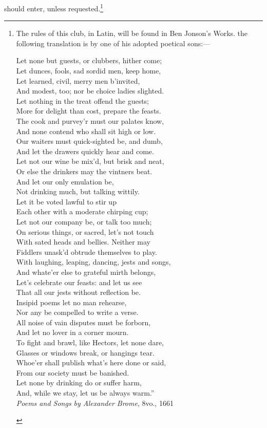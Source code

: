 should enter, unless requested.\footnote{\textit{}
The rules of this club, in Latin, will be found in Ben
Jonson’s Works. the following translation is by one of
his adopted poetical sons:—
\settowidth{\versewidth}{Let none but guests, or clubbers, hither come;}
\begin{fnverse}
Let none but guests, or clubbers, hither come;\\
Let dunces, fools, sad sordid men, keep home,\\
Let learned, civil, merry men b’invited,\\
And modest, too; nor be choice ladies slighted.\\
Let nothing in the treat offend the guests;\\
More for delight than cost, prepare the feasts.\\
The cook and purvey’r must our palates know,\\
And none contend who shall sit high or low.\\
Our waiters must quick-sighted be, and dumb,\\
And let the drawers quickly hear and come.\\
Let not our wine be mix'd, but brisk and neat,\\
Or else the drinkers may the vintners beat.\\
And let our only emulation be,\\
Not drinking much, but talking wittily.\\
Let it be voted lawful to stir up\\
Each other with a moderate chirping cup;\\
Let not our company be, or talk too much;\\
On serious things, or sacred, let's not touch\\
With sated heads and bellies. Neither may\\
Fiddlers unask’d obtrude themselves to play.\\
With laughing, leaping, dancing, jests and songs,\\
And whate’er else to grateful mirth belongs,\\
Let’s celebrate our feasts: and let us see\\
That all our jests without reflection be.\\
Insipid poems let no man rehearse,\\
Nor any be compelled to write a verse.\\
All noise of vain disputes must be forborn,\\
And let no lover in a corner mourn.\\
To fight and brawl, like Hectors, let none dare,\\
Glasses or windows break, or hangings tear.\\
Whoe’er shall publish what’s here done or said,\\
From our society must be banished.\\
Let none by drinking do or suffer harm,\\
And, while we stay, let us be always warm.”\\
\vin \textit{Poems and Songs by Alexander Brome}, 8vo., 1661
\end{fnverse}}
